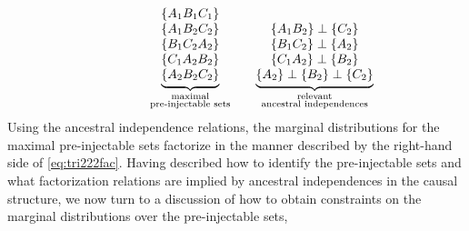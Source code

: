 \begin{align}
\qquad\qquad
{\underbrace{\begin{matrix}
\left\lbrace A_1 B_1 C_1\right\rbrace \\
\left\lbrace A_1 B_2 C_2\right\rbrace \\
\left\lbrace B_1 C_2 A_2\right\rbrace \\
\left\lbrace C_1 A_2 B_2\right\rbrace \\
\left\lbrace A_2 B_2 C_2\right\rbrace
\end{matrix}}_{\substack{\text{maximal}\\\text{pre-injectable sets}}}}
\qquad
{\underbrace{\begin{matrix}
\\
\{A_1 B_2\} \perp\{ C_2\} \\
\{B_1 C_2\} \perp\{ A_2\} \\
\{C_1 A_2\} \perp\{ B_2\} \\
\{A_2\} \perp\{B_2\} \perp\{ C_2\}
\end{matrix}}_{\substack{\text{relevant}\\\text{ancestral independences}}}}
\end{align}
Using the ancestral independence relations, the marginal distributions for the maximal pre-injectable sets factorize in the manner described by the right-hand side of \cref{eq:tri222fac}.
Having described how to identify the pre-injectable sets and what factorization relations are implied by ancestral independences in the causal structure, we now turn to a discussion of how to obtain constraints on the marginal distributions over the pre-injectable sets, 

